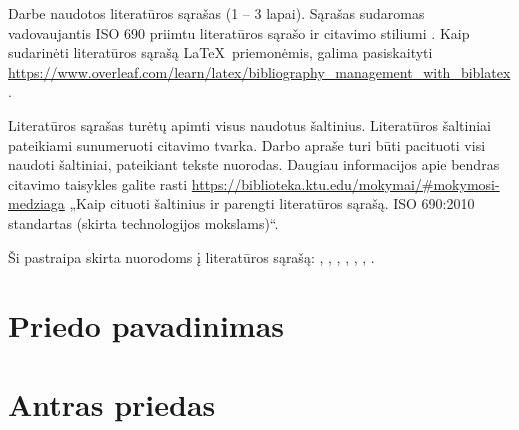 \documentclass{ktuthesis}
\begin{document}
	\clearpage
	\printbibliography[title={\hfil\fontsize{12}{15}\selectfont{Literatūros sąrašas}}]
	
	Darbe naudotos literatūros sąrašas (1 – 3 lapai). Sąrašas sudaromas vadovaujantis ISO 690 priimtu literatūros sąrašo ir citavimo stiliumi \cite{rastodarbai}.
	Kaip sudarinėti literatūros sąrašą \LaTeX \ priemonėmis, galima pasiskaityti \url{https://www.overleaf.com/learn/latex/bibliography_management_with_biblatex}.
	
	Literatūros sąrašas turėtų apimti visus naudotus šaltinius. Literatūros šaltiniai pateikiami sunumeruoti citavimo tvarka.
	Darbo apraše turi būti pacituoti visi naudoti šaltiniai, pateikiant tekste nuorodas. Daugiau informacijos apie bendras citavimo taisykles galite
	rasti \url{https://biblioteka.ktu.edu/mokymai/#mokymosi-medziaga} „Kaip cituoti šaltinius ir parengti literatūros sąrašą. ISO 690:2010 standartas
	(skirta technologijos mokslams)“.
	
	Ši pastraipa skirta nuorodoms į literatūros sąrašą: \cite{litnet}, \cite{ontologies}, \cite{valstybestarnyba}, \cite{spaudosdraudimas}, \cite{krastoapsauga}, \cite{citationguide}, \cite{velomobilis}.
	
	\newpage
	
	\appendix
	\renewcommand{\thesection}{\arabic{section}}
	
	\section{Priedo pavadinimas}
	
	\section{Antras priedas}
	
\end{document}
